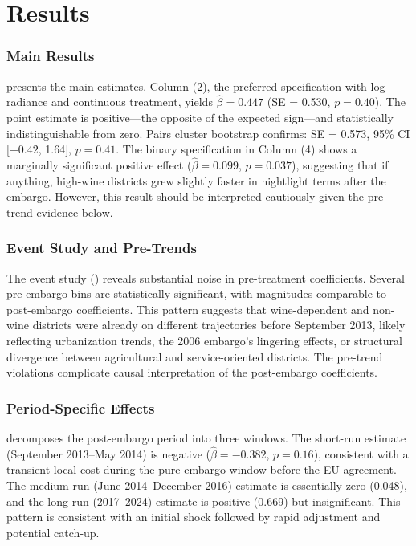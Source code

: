 \documentclass[12pt]{article}
\begin{document}
\section{Results}

\subsubsection*{Main Results}  presents the main estimates. Column (2), the preferred specification with log radiance and continuous treatment, yields $\hat{\beta} = 0.447$ (SE = 0.530, $p = 0.40$). The point estimate is positive---the opposite of the expected sign---and statistically indistinguishable from zero. Pairs cluster bootstrap confirms: SE = 0.573, 95\% CI [$-0.42$, 1.64], $p = 0.41$. The binary specification in Column (4) shows a marginally significant positive effect ($\hat{\beta} = 0.099$, $p = 0.037$), suggesting that if anything, high-wine districts grew slightly faster in nightlight terms after the embargo. However, this result should be interpreted cautiously given the pre-trend evidence below.

\subsubsection*{Event Study and Pre-Trends} The event study () reveals substantial noise in pre-treatment coefficients. Several pre-embargo bins are statistically significant, with magnitudes comparable to post-embargo coefficients. This pattern suggests that wine-dependent and non-wine districts were already on different trajectories before September 2013, likely reflecting urbanization trends, the 2006 embargo's lingering effects, or structural divergence between agricultural and service-oriented districts. The pre-trend violations complicate causal interpretation of the post-embargo coefficients.

\subsubsection*{Period-Specific Effects}  decomposes the post-embargo period into three windows. The short-run estimate (September 2013--May 2014) is negative ($\hat{\beta} = -0.382$, $p = 0.16$), consistent with a transient local cost during the pure embargo window before the EU agreement. The medium-run (June 2014--December 2016) estimate is essentially zero (0.048), and the long-run (2017--2024) estimate is positive (0.669) but insignificant. This pattern is consistent with an initial shock followed by rapid adjustment and potential catch-up.
\end{document}
